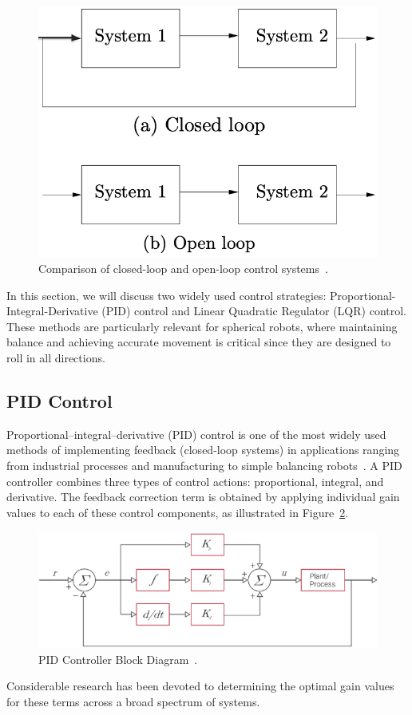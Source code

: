 \documentclass[english, bachelor, utf8]{base/thesis_telematics}
\begin{document}
\begin{figure}[ht]
\centering
\includegraphics[width=0.4\columnwidth]{pics/systems.png}
\caption{Comparison of closed-loop and open-loop control systems~\cite{feedbackBook}.}
\label{fig:control_systems}
\end{figure}

In this section, we will discuss two widely used control strategies: Proportional-Integral-Derivative (PID) control and Linear Quadratic Regulator (LQR) control.
These methods are particularly relevant for spherical robots, where maintaining balance and achieving accurate movement is critical since they are designed to roll in all directions.
\subsection{PID Control}
Proportional–integral–derivative (PID) control is one of the most widely used methods of implementing feedback (closed-loop systems) in applications ranging from industrial processes and manufacturing to simple balancing robots~\cite{feedbackBook}. 
A PID controller combines three types of control actions: proportional, integral, and derivative. The feedback correction term is obtained by applying individual gain values to each of these control components, as illustrated in Figure~\ref{fig:pid_control}.
\begin{figure}[ht]
\centering
\includegraphics[width=0.7\columnwidth]{pics/pid_control.png}
\caption{PID Controller Block Diagram~\cite{vectornav_math_controls}.}
\label{fig:pid_control}
\end{figure}

Considerable research has been devoted to determining the optimal gain values for these terms across a broad spectrum of systems.
\end{document}
